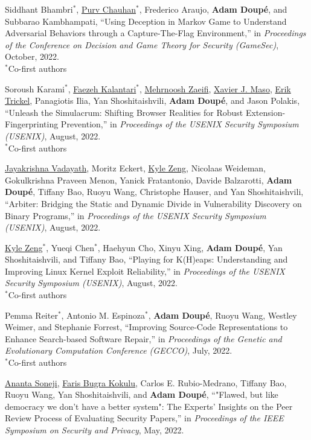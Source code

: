 \documentclass[11pt,letterpaper,sans]{moderncv}
\begin{document}
\begin{etaremune}
\item Siddhant Bhambri$^*$,  \underline{Purv Chauhan}$^*$,  Frederico Araujo,  \textbf{Adam Doup\'e}, and  Subbarao Kambhampati, ``Using Deception in Markov Game to Understand Adversarial Behaviors through a Capture-The-Flag Environment,'' in \emph{Proceedings of the Conference on Decision and Game Theory for Security (GameSec)}, October, 2022. \\
  $^*$Co-first authors
  
  
\item Soroush Karami$^*$,  \underline{Faezeh Kalantari}$^*$, \underline{Mehrnoosh Zaeifi},  \underline{Xavier J. Maso},  \underline{Erik Trickel},  Panagiotis Ilia,  Yan Shoshitaishvili,  \textbf{Adam Doup\'e}, and  Jason Polakis, ``Unleash the Simulacrum: Shifting Browser Realities for Robust Extension-Fingerprinting Prevention,'' in \emph{Proceedings of the USENIX Security Symposium (USENIX)}, August, 2022. \\
  $^*$Co-first authors
  
\item \underline{Jayakrishna Vadayath},  Moritz Eckert,  \underline{Kyle Zeng},  Nicolaas Weideman,  Gokulkrishna Praveen Menon,  Yanick Fratantonio,  Davide Balzarotti,  \textbf{Adam Doup\'e},  Tiffany Bao,  Ruoyu Wang, Christophe Hauser, and  Yan Shoshitaishvili, ``Arbiter: Bridging the Static and Dynamic Divide in Vulnerability Discovery on Binary Programs,'' in \emph{Proceedings of the USENIX Security Symposium (USENIX)}, August, 2022.
  
\item \underline{Kyle Zeng}$^*$,  Yueqi Chen$^*$,  Haehyun Cho,  Xinyu Xing,  \textbf{Adam Doup\'e},  Yan Shoshitaishvili, and Tiffany Bao, ``Playing for K(H)eaps: Understanding and Improving Linux Kernel Exploit Reliability,'' in \emph{Proceedings of the USENIX Security Symposium (USENIX)}, August, 2022. \\
  $^*$Co-first authors

\item Pemma Reiter$^*$,  Antonio M. Espinoza$^*$,  \textbf{Adam Doup\'e},  Ruoyu Wang,  Westley Weimer, and Stephanie Forrest, ``Improving Source-Code Representations to Enhance Search-based Software Repair,'' in \emph{Proceedings of the Genetic and Evolutionary Computation Conference (GECCO)}, July, 2022. \\
  $^*$Co-first authors
  
\item \underline{Ananta Soneji},  \underline{Faris Bugra Kokulu},  Carlos E. Rubio-Medrano,  Tiffany Bao,  Ruoyu Wang,  Yan Shoshitaishvili, and  \textbf{Adam Doup\'e}, ``"Flawed, but like democracy we don't have a better system": The Experts' Insights on the Peer Review Process of Evaluating Security Papers,'' in \emph{Proceedings of the IEEE Symposium on Security and Privacy}, May, 2022.
  

\end{etaremune}
\end{document}
